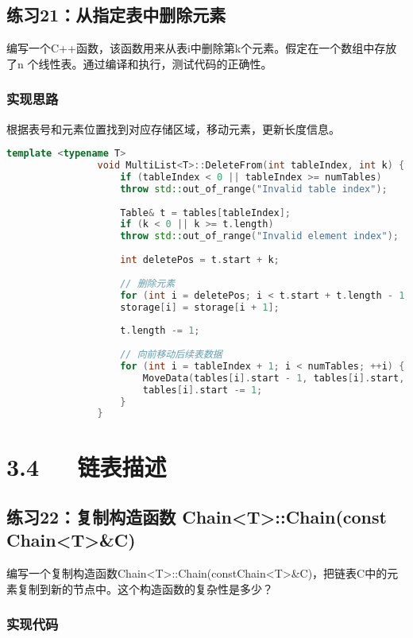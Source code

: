 \documentclass[UTF8]{ctexart}
\begin{document}
			\subsection{练习21：从指定表中删除元素}
			编写一个C++函数，该函数用来从表i中删除第k个元素。假定在一个数组中存放了n
			个线性表。通过编译和执行，测试代码的正确性。
			\subsubsection{实现思路}
			根据表号和元素位置找到对应存储区域，移动元素，更新长度信息。
			\begin{lstlisting}[language=C++]
				template <typename T>
				void MultiList<T>::DeleteFrom(int tableIndex, int k) {
					if (tableIndex < 0 || tableIndex >= numTables)
					throw std::out_of_range("Invalid table index");
					
					Table& t = tables[tableIndex];
					if (k < 0 || k >= t.length)
					throw std::out_of_range("Invalid element index");
					
					int deletePos = t.start + k;
					
					// 删除元素
					for (int i = deletePos; i < t.start + t.length - 1; ++i)
					storage[i] = storage[i + 1];
					
					t.length -= 1;
					
					// 向前移动后续表数据
					for (int i = tableIndex + 1; i < numTables; ++i) {
						MoveData(tables[i].start - 1, tables[i].start, tables[i].length);
						tables[i].start -= 1;
					}
				}
			\end{lstlisting}
			
	\section{3.4~~~链表描述}
			
	\subsection*{练习22：复制构造函数 Chain<T>::Chain(const Chain<T>\&C)}
	编写一个复制构造函数Chain<T>::Chain(constChain<T>\&C)，把链表C中的元素复制到新的节点中。这个构造函数的复杂性是多少？
	\subsubsection*{实现代码}
	
\end{document}
